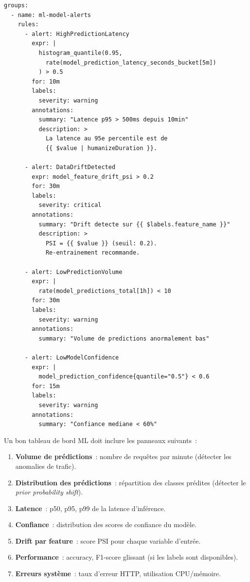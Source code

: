 \begin{codeblock}[title=\textbf{R\`egles d'alerte Prometheus \file{ml\_alerts.yml}}]
\begin{verbatim}
groups:
  - name: ml-model-alerts
    rules:
      - alert: HighPredictionLatency
        expr: |
          histogram_quantile(0.95,
            rate(model_prediction_latency_seconds_bucket[5m])
          ) > 0.5
        for: 10m
        labels:
          severity: warning
        annotations:
          summary: "Latence p95 > 500ms depuis 10min"
          description: >
            La latence au 95e percentile est de
            {{ $value | humanizeDuration }}.

      - alert: DataDriftDetected
        expr: model_feature_drift_psi > 0.2
        for: 30m
        labels:
          severity: critical
        annotations:
          summary: "Drift detecte sur {{ $labels.feature_name }}"
          description: >
            PSI = {{ $value }} (seuil: 0.2).
            Re-entrainement recommande.

      - alert: LowPredictionVolume
        expr: |
          rate(model_predictions_total[1h]) < 10
        for: 30m
        labels:
          severity: warning
        annotations:
          summary: "Volume de predictions anormalement bas"

      - alert: LowModelConfidence
        expr: |
          model_prediction_confidence{quantile="0.5"} < 0.6
        for: 15m
        labels:
          severity: warning
        annotations:
          summary: "Confiance mediane < 60%"
\end{verbatim}
\end{codeblock}

\begin{bonnepratique}[title=\textbf{Tableau de bord Grafana -- m\'etriques essentielles}]
Un bon tableau de bord ML doit inclure les panneaux suivants~:
\begin{enumerate}
    \item \textbf{Volume de pr\'edictions}~: nombre de requ\^etes par minute (d\'etecter les anomalies de trafic).
    \item \textbf{Distribution des pr\'edictions}~: r\'epartition des classes pr\'edites (d\'etecter le \emph{prior probability shift}).
    \item \textbf{Latence}~: p50, p95, p99 de la latence d'inf\'erence.
    \item \textbf{Confiance}~: distribution des scores de confiance du mod\`ele.
    \item \textbf{Drift par feature}~: score PSI pour chaque variable d'entr\'ee.
    \item \textbf{Performance}~: accuracy, F1-score glissant (si les labels sont disponibles).
    \item \textbf{Erreurs syst\`eme}~: taux d'erreur HTTP, utilisation CPU/m\'emoire.
\end{enumerate}
\end{bonnepratique}

